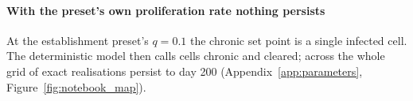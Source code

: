 \paragraph{With the preset's own proliferation rate nothing persists}
At the establishment preset's $q = 0.1$ the chronic set point is a single infected cell. The deterministic model then calls \MapNotebookChronicCells{} cells chronic and \MapNotebookClearedCells{} cleared; across the whole grid \MapNotebookPersisting{} of \MapNotebookRuns{} exact realisations persist to day 200 (Appendix~\ref{app:parameters}, Figure~\ref{fig:notebook_map}).
